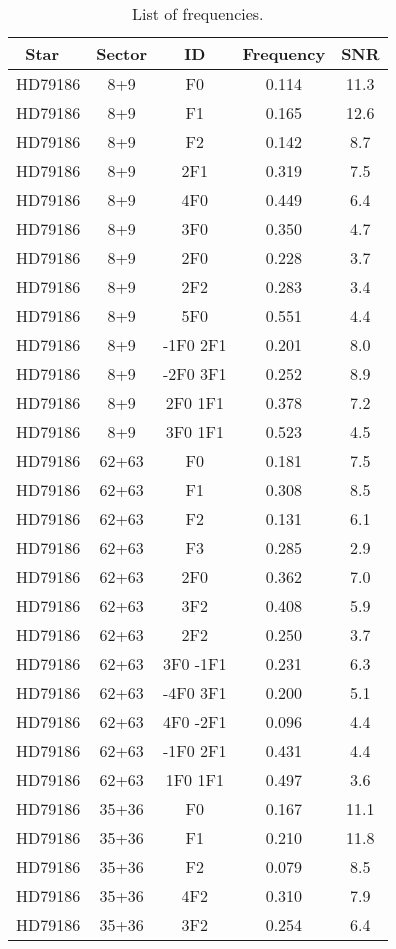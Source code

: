 \begin{table*}
\caption{\label{sample} List of frequencies.}
\begin{tabular}{l c c c c}
\hline\
Star & Sector & ID & Frequency & SNR\\
\hline
HD79186 & 8+9 & F0 & 0.114 & 11.3\\ 
HD79186 & 8+9 & F1 & 0.165 & 12.6\\ 
HD79186 & 8+9 & F2 & 0.142 & 8.7\\ 
HD79186 & 8+9 & 2F1 & 0.319 & 7.5\\ 
HD79186 & 8+9 & 4F0 & 0.449 & 6.4\\ 
HD79186 & 8+9 & 3F0 & 0.350 & 4.7\\ 
HD79186 & 8+9 & 2F0 & 0.228 & 3.7\\ 
HD79186 & 8+9 & 2F2 & 0.283 & 3.4\\ 
HD79186 & 8+9 & 5F0 & 0.551 & 4.4\\ 
HD79186 & 8+9 & -1F0 2F1 & 0.201 & 8.0\\ 
HD79186 & 8+9 & -2F0 3F1 & 0.252 & 8.9\\ 
HD79186 & 8+9 & 2F0 1F1 & 0.378 & 7.2\\ 
HD79186 & 8+9 & 3F0 1F1 & 0.523 & 4.5\\ 
\hline
HD79186 & 62+63 & F0 & 0.181 & 7.5\\ 
HD79186 & 62+63 & F1 & 0.308 & 8.5\\ 
HD79186 & 62+63 & F2 & 0.131 & 6.1\\ 
HD79186 & 62+63 & F3 & 0.285 & 2.9\\ 
HD79186 & 62+63 & 2F0 & 0.362 & 7.0\\ 
HD79186 & 62+63 & 3F2 & 0.408 & 5.9\\ 
HD79186 & 62+63 & 2F2 & 0.250 & 3.7\\ 
HD79186 & 62+63 & 3F0 -1F1 & 0.231 & 6.3\\ 
HD79186 & 62+63 & -4F0 3F1 & 0.200 & 5.1\\ 
HD79186 & 62+63 & 4F0 -2F1 & 0.096 & 4.4\\ 
HD79186 & 62+63 & -1F0 2F1 & 0.431 & 4.4\\ 
HD79186 & 62+63 & 1F0 1F1 & 0.497 & 3.6\\ 
\hline
HD79186 & 35+36 & F0 & 0.167 & 11.1\\ 
HD79186 & 35+36 & F1 & 0.210 & 11.8\\ 
HD79186 & 35+36 & F2 & 0.079 & 8.5\\ 
HD79186 & 35+36 & 4F2 & 0.310 & 7.9\\ 
HD79186 & 35+36 & 3F2 & 0.254 & 6.4\\ 

\end{tabular}
\end{table*}
